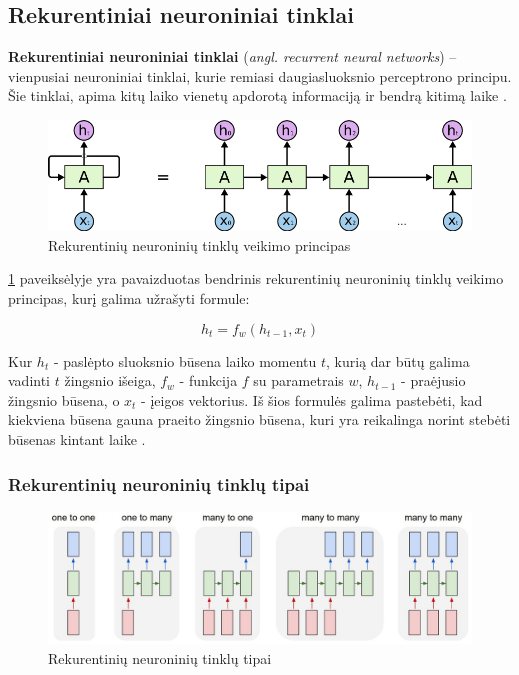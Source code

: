 \documentclass{VUMIFPSbakalaurinis}
\begin{document}
\subsection{Rekurentiniai neuroniniai tinklai}

\textbf{Rekurentiniai neuroniniai tinklai} (\textit{angl. recurrent neural networks}) – vienpusiai neuroniniai tinklai, kurie remiasi daugiasluoksnio perceptrono principu. Šie tinklai, apima kitų laiko vienetų apdorotą informaciją ir bendrą kitimą laike \cite{DBLP:journals/corr/Lipton15}.


\begin{figure}[H]
	\centering
	\includegraphics[scale=0.4]{img/rnn}
	\caption{Rekurentinių neuroninių tinklų veikimo principas}
	\label{img:rnn}
\end{figure}

\ref{img:rnn} paveiksėlyje yra pavaizduotas bendrinis rekurentinių neuroninių tinklų veikimo principas, kurį galima užrašyti formule:

\begin{equation}\label{eq:rnn}
h_t = f_w(h_{t-1}, x_t)
\end{equation}

Kur $h_t$ - paslėpto sluoksnio būsena laiko momentu $t$, kurią dar būtų galima vadinti $t$ žingsnio išeiga, $f_w$ - funkcija $f$ su parametrais $w$, $h_{t-1}$ - praėjusio žingsnio būsena, o $x_t$ - įeigos vektorius. Iš šios formulės galima pastebėti, kad kiekviena būsena gauna praeito žingsnio būsena, kuri yra reikalinga norint stebėti būsenas kintant laike	.


\subsubsection{Rekurentinių neuroninių tinklų tipai}

\begin{figure}[H]
	\centering
	\includegraphics[scale=0.3]{img/nn-tipai}
	\caption{Rekurentinių neuroninių tinklų tipai}
	\label{img:tipai}
\end{figure}
\end{document}
